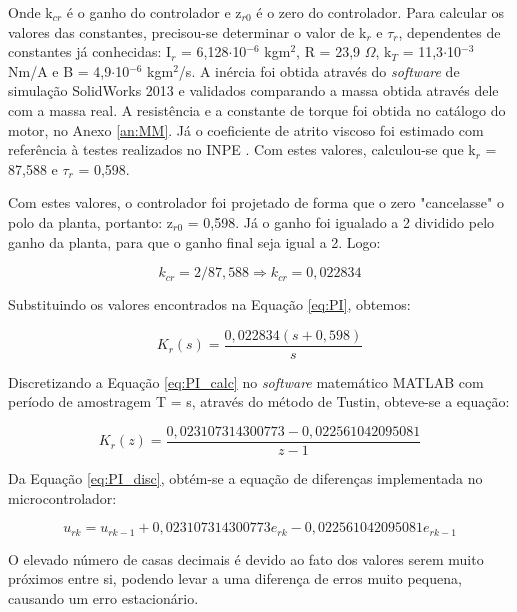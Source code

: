 \documentclass[
	12pt,				%
	openany,			%
	twoside,			%
	a4paper,			%
	english,			%
	french,				%
	spanish,			%
	brazil,				%
	oldfontcommands
	]{abntex2}
\begin{document}
Onde k$_{cr}$ é o ganho do controlador e z$_{r0}$ é o zero do controlador. Para calcular os valores das constantes, precisou-se determinar o valor de k$_{r}$ e $\tau_{r}$, dependentes de constantes já conhecidas: I$_{r}$ = 6,128$\cdot$10$^{-6}$ kgm$^{2}$, R = 23,9 $\Omega$, k$_{T}$ = 11,3$\cdot$10$^{-3}$ Nm/A e B = 4,9$\cdot$10$^{-6}$ kgm$^{2}$/s. A inércia foi obtida através do \textit{software} de simulação SolidWorks 2013 e validados comparando a massa obtida através dele com a massa real. A resistência e a constante de torque foi obtida no catálogo do motor, no Anexo \ref{an:MM}. Já o coeficiente de atrito viscoso foi estimado com referência à testes realizados no INPE \cite{Carrara}. Com estes valores, calculou-se que k$_{r}$ = 87,588 e $\tau_{r}$ = 0,598.

Com estes valores, o controlador foi projetado de forma que o zero "cancelasse" o polo da planta, portanto: z$_{r0}$ = 0,598. Já o ganho foi igualado a 2 dividido pelo ganho da planta, para que o ganho final seja igual a 2. Logo:

\begin{equation}
k_{cr} = 2/87,588 \Longrightarrow k_{cr} = 0,022834 \nonumber
\label{eq:kcr}
\end{equation}

Substituindo os valores encontrados na Equação \ref{eq:PI}, obtemos:

\begin{equation}
K_{r}(s) = \frac{0,022834(s+0,598)}{s}
\label{eq:PI_calc}
\end{equation}

Discretizando a Equação \ref{eq:PI_calc} no \textit{software} matemático MATLAB com período de amostragem T =  s, através do método de Tustin, obteve-se a equação:

\begin{equation}
K_{r}(z) = \frac{0,023107314300773-0,022561042095081}{z-1}
\label{eq:PI_disc}
\end{equation}

Da Equação \ref{eq:PI_disc}, obtém-se a equação de diferenças implementada no microcontrolador:

\begin{equation}
u_{rk} = u_{rk-1} + 0,023107314300773e_{rk} - 0,022561042095081e_{rk-1}
\label{eq:PI_eqdif}
\end{equation}

O elevado número de casas decimais é devido ao fato dos valores serem muito próximos entre si, podendo levar a uma diferença de erros muito pequena, causando um erro estacionário.
\end{document}
